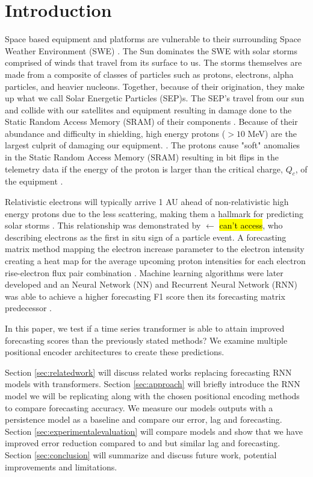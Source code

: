 \section{Introduction}
Space based equipment and platforms are vulnerable to their surrounding Space Weather Environment (SWE) . The Sun dominates the SWE with solar storms comprised of winds that travel from its surface to us. The storms themselves are made from a composite of classes of particles such as protons, electrons, alpha particles, and heavier nucleons. Together, because of their origination, they make up what we call Solar Energetic Particles (SEP)s. The SEP's travel from our sun and collide with our satellites and equipment resulting in damage done to the Static Random Access Memory (SRAM) of their components \cite{noeldeke2021single}. Because of their abundance and difficulty in shielding,  high energy protons ($>10$ MeV) are the largest culprit of damaging our equipment. \cite{torres2025machine}.     The protons cause "soft" anomalies in the Static Random Access Memory (SRAM) resulting in bit flips in the telemetry data \cite{carlton2018telemetry} if the energy of the proton is larger than the critical charge, $Q_c$, of the equipment \cite{barak1999figure}. 

Relativistic electrons will typically arrive 1 AU ahead of non-relativistic  high energy protons due to the less scattering, making them a hallmark for predicting solar storms \cite{posner2007forecasting}. This relationship was demonstrated by \cite{vanhollebeke1975variation} $\leftarrow$ \hl{can't access}, who describing electrons as the first in situ sign of a particle event.  A forecasting matrix method mapping the electron increase parameter to the electron intensity creating a heat map for the average upcoming proton intensities for each electron rise-electron flux pair combination \cite{posner2007forecasting}. Machine learning algorithms were later developed and an Neural Network (NN) and Recurrent Neural Network (RNN) was able to achieve a higher forecasting F1 score then its  forecasting matrix predecessor \cite{torres2025machine}. 

In this paper, we test if a time series transformer is able to attain improved forecasting scores than the previously stated methods? We examine multiple positional encoder architectures to create these predictions.

 Section \ref{sec:relatedwork} will discuss related works replacing forecasting RNN models with transformers. Section \ref{sec:approach} will briefly introduce the RNN model we will be replicating along with the chosen positional encoding methods to compare forecasting accuracy.  We measure our models outputs with a persistence model as a baseline \cite{torres2025machine} and compare our error, lag and forecasting. Section \ref{sec:experimentalevaluation} will compare models and show that we have improved error reduction compared to \cite{torres2025machine} and \cite{posner2007forecasting} but similar lag and forecasting. Section \ref{sec:conclusion} will summarize and discuss future work, potential improvements and limitations.
